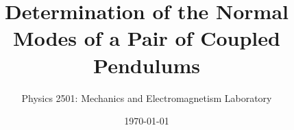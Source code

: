 \documentclass{revtex4}
\begin{document}

\title{Determination of the Normal Modes of a Pair of Coupled Pendulums}


\author{Physics 2501: Mechanics and Electromagnetism Laboratory}


\date{\today}




\maketitle

\end{document}
